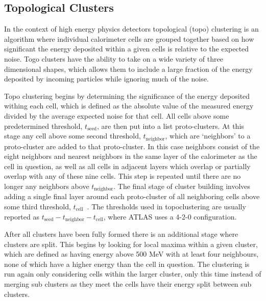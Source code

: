 \subsection{Topological Clusters}

In the context of high energy physics detectors topological (topo) clustering is an algorithm where individual calorimeter cells are grouped together based on how significant the energy deposited within a given cells is relative to the expected noise.  
Togo clusters have the ability to take on a wide variety of three dimensional shapes, which allows them to include a large fraction of the energy deposited by incoming particles while ignoring much of the noise.  

Topo clustering begins by determining the significance of the energy deposited withing each cell, which is defined as the absolute value of the measured energy divided by the average expected noise for that cell.  
All cells above some predetermined threshold, $t_{\mathrm{seed}}$, are then put into a list proto-clusters.  
At this stage any cell above some second threshold, $t_{\mathrm{neighbor}}$, which are `neighbors' to a proto-cluster are added to that proto-cluster.  
In this case neighbors consist of the eight neighbors and nearest neighbors in the same layer of the calorimeter as the cell in question, as well as all cells in adjacent layers which overlap or partially overlap with any of these nine cells.  
This step is repeated until there are no longer any neighbors above $t_{\mathrm{neighbor}}$.  
The final stage of cluster building involves adding a single final layer around each proto-cluster of all neighboring cells above some third threshold, $t_{\mathrm{cell}}$~\cite{1603.02934}.  
The thresholds used in topoclustering are usually reported as $t_{\mathrm{seed}}-t_{\mathrm{neighbor}}-t_{\mathrm{cell}}$, where ATLAS uses a 4-2-0 configuration.  

After all clusters have been fully formed there is an additional stage where clusters are split.  
This begins by looking for local maxima within a given cluster, which are defined as having energy above 500 MeV with at least four neighbours, none of which have a higher energy than the cell in question.  
The clustering is run again only considering cells within the larger cluster, only this time instead of merging sub clusters as they meet the cells have their energy split between sub clusters.  
 
